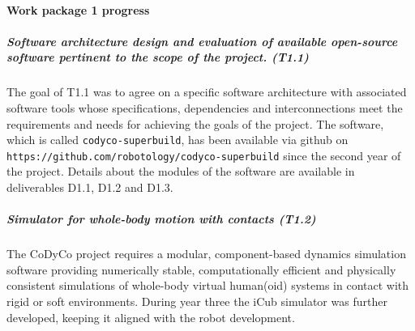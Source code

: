 

\newcommand{\EQ}{\!\!\!=\!\!\!}

\newcommand{\Bp}{\mathbf{p}}
\newcommand{\Br}{\mathbf{r}}
\newcommand{\Bf}{\mathbf{f}}
\newcommand{\BJ}{\mathbf{J}}
\newcommand{\Bv}{\mathbf{v}}
\newcommand{\BI}{\mathbf{I}}
\newcommand{\BR}{\mathbf{R}}
\newcommand{\BK}{\mathbf{K}}
\newcommand{\BD}{\mathbf{D}}
\newcommand{\BA}{\mathbf{A}}
\newcommand{\Bb}{\mathbf{b}}
\newcommand{\BM}{\mathbf{M}}
\newcommand{\BC}{\mathbf{C}}
\newcommand{\Bg}{\mathbf{g}}
\newcommand{\BS}{\mathbf{S}}
\newcommand{\Bzero}{\mathbf{0}}
\newcommand{\BN}{\mathbf{N}}
\newcommand{\Bh}{\mathbf{h}}
\newcommand{\BW}{\mathbf{W}}
\newcommand{\Bq}{\mathbf{q}}
\newcommand{\BF}{\mathbf{F}}
\newcommand{\Bn}{\mathbf{n}}
\newcommand{\BZ}{\mathbf{Z}}
\newcommand{\BB}{\mathbf{B}}
\newcommand{\Bc}{\mathbf{c}}

\newcommand{\Bomega}{\boldsymbol{\omega}}
\newcommand{\Btau}{\boldsymbol{\tau}}
\newcommand{\Balpha}{\boldsymbol{\alpha}}
\newcommand{\Bbeta}{\boldsymbol{\beta}}



\paragraph{Work package 1 progress} \label{sec:wp1}

\subparagraph*{Software architecture design and evaluation of available
  open-source software pertinent to the scope of the project. (T1.1)}

The goal of T1.1 was to agree on a specific software architecture with
associated software tools whose specifications, dependencies and
interconnections meet the requirements and needs for achieving the goals of
the project.  The software, which is called \texttt{codyco-superbuild}, has
been available via github on
\texttt{https://github.com/robotology/codyco-superbuild} since the second year
of the project.  Details about the modules of the software are available in
deliverables D1.1, D1.2 and D1.3.

\subparagraph*{Simulator for whole-body motion with contacts (T1.2)}

The CoDyCo project requires a modular, component-based dynamics simulation
software providing numerically stable, computationally efficient and
physically consistent simulations of whole-body virtual human(oid) systems in
contact with rigid or soft environments.  During year three the iCub
simulator was further developed, keeping it aligned with the robot development.


